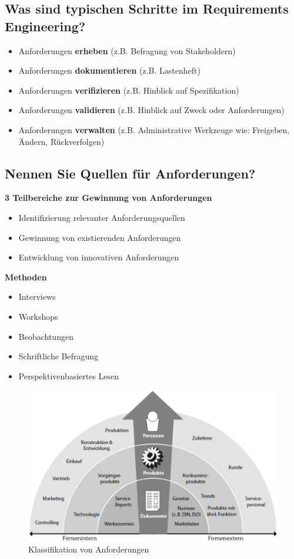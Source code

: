 \subsection{Was sind typischen Schritte im Requirements Engineering?}

\begin{itemize}
    \item Anforderungen \textbf{erheben} (z.B. Befragung von Stakeholdern)
    \item Anforderungen \textbf{dokumentieren} (z.B. Lastenheft)
    \item Anforderungen \textbf{verifizieren} (z.B. Hinblick auf Spezifikation)
    \item Anforderungen \textbf{validieren} (z.B. Hinblick auf Zweck oder Anforderungen)
    \item Anforderungen \textbf{verwalten} (z.B. Administrative Werkzeuge wie: Freigeben, Ändern, Rückverfolgen)
\end{itemize}

\subsection{Nennen Sie Quellen für Anforderungen?}

\textbf{3 Teilbereiche zur Gewinnung von Anforderungen}
\begin{itemize}
    \item Identifizierung relevanter Anforderungsquellen
    \item Gewinnung von existierenden Anforderungen
    \item Entwicklung von innovativen Anforderungen
\end{itemize}

\textbf{Methoden}
\begin{itemize}
    \item Interviews
    \item Workshops
    \item Beobachtungen
    \item Schriftliche Befragung
    \item Perspektivenbasiertes Lesen
\end{itemize}

\begin{figure}[H]
    \centering
    \includegraphics[width=0.7\linewidth]{Bilder/Teil2_QuellenAnforderungen.png}
    \caption{Klassifikation von Anforderungen}
\end{figure}

